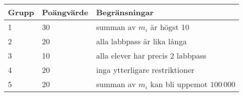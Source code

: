 \begin{tabular}{| l | l | l |}
	\hline
	Grupp & Poängvärde & Begränsningar\\ \hline
  1     & 30         & summan av $m_i$ är högst 10 \\ \hline
  2     & 20         & alla labbpass är lika långa \\ \hline
  3     & 10         & alla elever har precis 2 labbpass \\ \hline
  4     & 20         & inga ytterligare restriktioner \\ \hline
  5     & 20         & summan av $m_i$ kan bli uppemot $100\,000$ \\ \hline
\end{tabular}
